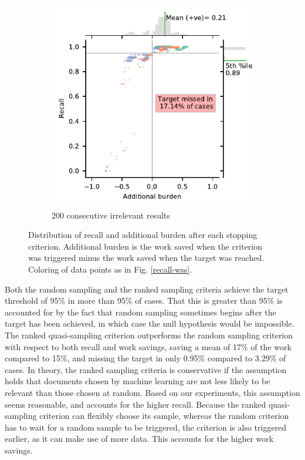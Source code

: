 \documentclass{bmcart}
\begin{document}
\begin{figure}
\begin{subfigure}[b]{0.475\textwidth}
		\end{subfigure}
		\hfill
		\begin{subfigure}[b]{0.475\textwidth}   
			\centering 
			\includegraphics[width=\textwidth]{2_figs_jointplot_burden_ih_200.pdf}
			\caption[]%
			{{\footnotesize 200 consecutive irrelevant results }}    
			\label{fig:ih_100_ab}
		\end{subfigure}
		
		\caption{\small Distribution of recall and additional burden after each stopping criterion. Additional burden is the work saved when the criterion was triggered minus the work saved when the target was reached. Coloring of data points as in Fig. \ref{recall-wss}.}
		\label{recall-burden}
	\end{figure}
	
	
	
	Both the random sampling and the ranked sampling criteria achieve the target threshold of 95\% in more than 95\% of cases. 
	That this is greater than 95\% is accounted for by the fact that random sampling sometimes begins after the target has been achieved, in which case the null hypothesis would be  impossible.
	The ranked quasi-sampling criterion  outperforms the random sampling criterion with respect to both recall and work savings, saving a mean of 17\% of the work compared to 15\%, and missing the target in only 0.95\% compared to 3.29\% of cases. In theory, the ranked sampling criteria is conservative if the assumption holds that documents chosen by machine learning are not less likely to be relevant than those chosen at random. Based on our experiments, this assumption seems reasonable, and accounts for the higher recall. Because the ranked quasi-sampling criterion can flexibly choose its sample, whereas the random criterion has to wait for a random sample to be triggered, the criterion is also triggered earlier, as it can make use of more data. This accounts for the higher work savings.
	
\end{document}
